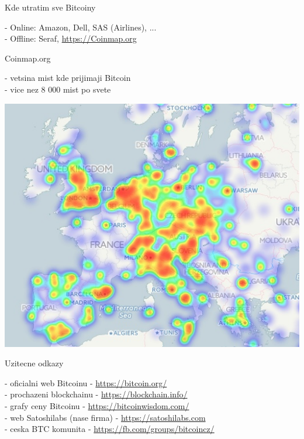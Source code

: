 \documentclass{beamer}
\begin{document}
\begin{frame}

    {\LARGE Kde utratim sve Bitcoiny}\\

    \vspace{5mm}

    - Online: Amazon, Dell, SAS (Airlines), ...\\
    - Offline: Seraf, \url{https://Coinmap.org}\\

\end{frame}

\begin{frame}

    {\LARGE Coinmap.org}\\

    \vspace{5mm}

    - vetsina mist kde prijimaji Bitcoin\\
    - vice nez 8 000 mist po svete\\

    \vspace{5mm}

    \includegraphics[scale=0.4]{img/coinmap}

\end{frame}

\begin{frame}

    {\LARGE Uzitecne odkazy}\\

    \vspace{5mm}

    - oficialni web Bitcoinu - \url{https://bitcoin.org/}\\
    - prochazeni blockchainu - \url{https://blockchain.info/}\\
    - grafy ceny Bitcoinu - \url{https://bitcoinwisdom.com/}\\
    - web Satoshilabs (nase firma) - \url{https://satoshilabs.com}\\
    - ceska BTC komunita - \url{https://fb.com/groups/bitcoincz/}\\

\end{frame}
\end{document}
